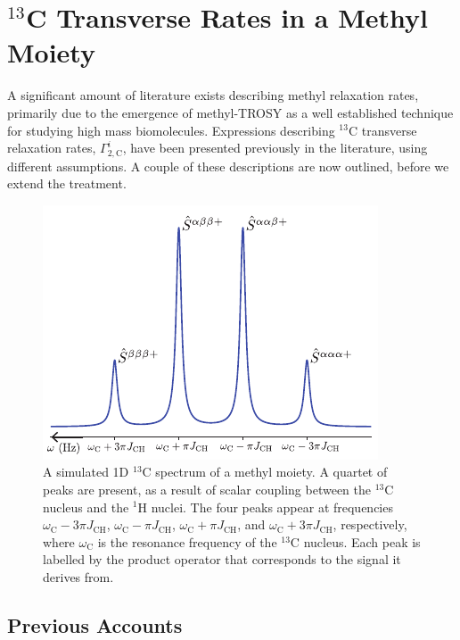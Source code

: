 \section{$^{13}$C Transverse Rates in a Methyl Moiety}
A significant amount of literature exists describing methyl relaxation rates, primarily due to the emergence of methyl-TROSY as a well established technique for studying high mass biomolecules. Expressions describing $^{13}$C transverse relaxation rates, $\Gamma_{2,\text{C}}^{i}$, have been presented previously in the literature, using different assumptions. A couple of these descriptions are now outlined, before we extend the treatment.
\begin{figure}
\centering
\includegraphics[scale=1.2]{./Figures/SimonsFigs/13CQuartet.pdf}
\caption{A simulated 1D $^{13}$C spectrum of a methyl moiety. A quartet of peaks are present, as a result of scalar coupling between the $^{13}$C nucleus and the $^{1}$H nuclei. The four peaks appear at frequencies $\omega_{\text{C}} - 3 \pi J_{\text{CH}}$, $\omega_{\text{C}} - \pi J_{\text{CH}}$, $\omega_{\text{C}} + \pi J_{\text{CH}}$, and $\omega_{\text{C}} + 3 \pi J_{\text{CH}}$, respectively, where $\omega_{\text{C}}$ is the resonance frequency of the $^{13}$C nucleus. Each peak is labelled by the product operator that corresponds to the signal it derives from.}
\label{CQuart}
\end{figure}
\subsection{Previous Accounts} \label{PreviousModels}
